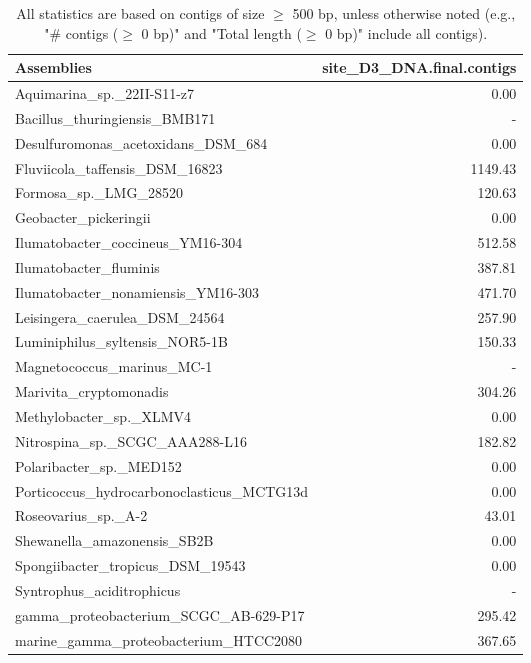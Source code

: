 \documentclass[12pt,a4paper]{article}
\begin{document}
\begin{table}[ht]
\begin{center}
\caption{All statistics are based on contigs of size $\geq$ 500 bp, unless otherwise noted (e.g., "\# contigs ($\geq$ 0 bp)" and "Total length ($\geq$ 0 bp)" include all contigs).}
\begin{tabular}{|l*{1}{|r}|}
\hline
Assemblies & site\_D3\_DNA.final.contigs \\ \hline
Aquimarina\_sp.\_22II-S11-z7 & 0.00 \\ \hline
Bacillus\_thuringiensis\_BMB171 & - \\ \hline
Desulfuromonas\_acetoxidans\_DSM\_684 & 0.00 \\ \hline
Fluviicola\_taffensis\_DSM\_16823 & 1149.43 \\ \hline
Formosa\_sp.\_LMG\_28520 & 120.63 \\ \hline
Geobacter\_pickeringii & 0.00 \\ \hline
Ilumatobacter\_coccineus\_YM16-304 & 512.58 \\ \hline
Ilumatobacter\_fluminis & 387.81 \\ \hline
Ilumatobacter\_nonamiensis\_YM16-303 & 471.70 \\ \hline
Leisingera\_caerulea\_DSM\_24564 & 257.90 \\ \hline
Luminiphilus\_syltensis\_NOR5-1B & 150.33 \\ \hline
Magnetococcus\_marinus\_MC-1 & - \\ \hline
Marivita\_cryptomonadis & 304.26 \\ \hline
Methylobacter\_sp.\_XLMV4 & 0.00 \\ \hline
Nitrospina\_sp.\_SCGC\_AAA288-L16 & 182.82 \\ \hline
Polaribacter\_sp.\_MED152 & 0.00 \\ \hline
Porticoccus\_hydrocarbonoclasticus\_MCTG13d & 0.00 \\ \hline
Roseovarius\_sp.\_A-2 & 43.01 \\ \hline
Shewanella\_amazonensis\_SB2B & 0.00 \\ \hline
Spongiibacter\_tropicus\_DSM\_19543 & 0.00 \\ \hline
Syntrophus\_aciditrophicus & - \\ \hline
gamma\_proteobacterium\_SCGC\_AB-629-P17 & 295.42 \\ \hline
marine\_gamma\_proteobacterium\_HTCC2080 & 367.65 \\ \hline
\end{tabular}
\end{center}
\end{table}
\end{document}
